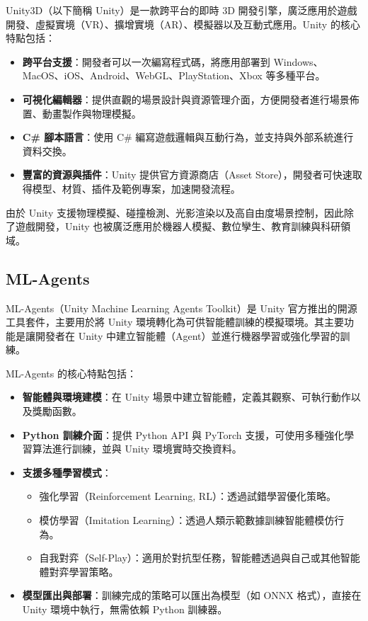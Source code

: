 \documentclass[12pt,a4paper]{ctexart}
\begin{document}
Unity3D（以下簡稱 Unity）是一款跨平台的即時 3D 開發引擎，廣泛應用於遊戲開發、虛擬實境（VR）、擴增實境（AR）、模擬器以及互動式應用。Unity 的核心特點包括：

\begin{itemize}
    \item \textbf{跨平台支援}：開發者可以一次編寫程式碼，將應用部署到 Windows、MacOS、iOS、Android、WebGL、PlayStation、Xbox 等多種平台。
    \item \textbf{可視化編輯器}：提供直觀的場景設計與資源管理介面，方便開發者進行場景佈置、動畫製作與物理模擬。
    \item \textbf{C\# 腳本語言}：使用 C\# 編寫遊戲邏輯與互動行為，並支持與外部系統進行資料交換。
    \item \textbf{豐富的資源與插件}：Unity 提供官方資源商店（Asset Store），開發者可快速取得模型、材質、插件及範例專案，加速開發流程。
\end{itemize}

由於 Unity 支援物理模擬、碰撞檢測、光影渲染以及高自由度場景控制，因此除了遊戲開發，Unity 也被廣泛應用於機器人模擬、數位孿生、教育訓練與科研領域。



\subsection{ML-Agents}
ML-Agents（Unity Machine Learning Agents Toolkit）是 Unity 官方推出的開源工具套件，主要用於將 Unity 環境轉化為可供智能體訓練的模擬環境。其主要功能是讓開發者在 Unity 中建立智能體（Agent）並進行機器學習或強化學習的訓練。
\\ \par
ML-Agents 的核心特點包括：

\begin{itemize}
	\item \textbf{智能體與環境建模}：在 Unity 場景中建立智能體，定義其觀察、可執行動作以及獎勵函數。
	
	\item \textbf{Python 訓練介面}：提供 Python API 與 PyTorch 支援，可使用多種強化學習算法進行訓練，並與 Unity 環境實時交換資料。
	
	\item \textbf{支援多種學習模式}：
	
	\begin{itemize}
	\item 強化學習（Reinforcement Learning, RL）：透過試錯學習優化策略。
	
	\item 模仿學習（Imitation Learning）：透過人類示範數據訓練智能體模仿行為。
	
	\item 自我對弈（Self-Play）：適用於對抗型任務，智能體透過與自己或其他智能體對弈學習策略。
	\end{itemize}	

	\item \textbf{模型匯出與部署}：訓練完成的策略可以匯出為模型（如 ONNX 格式），直接在 Unity 環境中執行，無需依賴 Python 訓練器。
\end{itemize}
\end{document}
